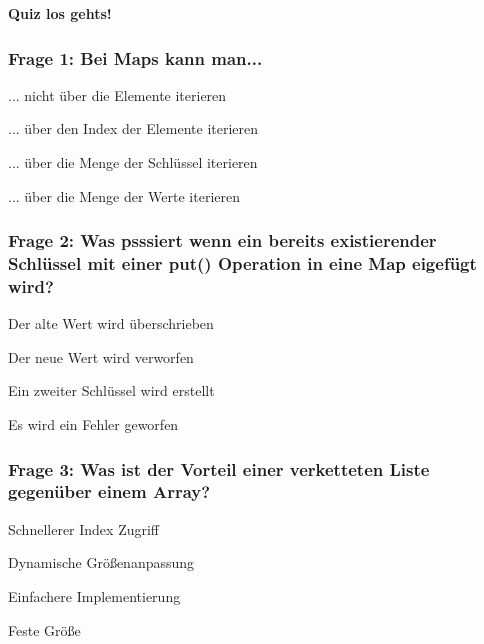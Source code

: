 \documentclass{../../presentation}
\begin{document}
\begin{frame}[plain]
	\centering
	{\Huge\bfseries{Quiz los gehts!}}
\end{frame}

\begin{frame}[fragile]
	\frametitle{Frage 1: Bei Maps kann man...}
	\begin{ausgabe}
		... nicht über die Elemente iterieren
	\end{ausgabe}
	\begin{ausgabe}
		... über den Index der Elemente iterieren
	\end{ausgabe}
	\begin{ausgabe}
		\textcolor<2->{green!100!black}{... über die Menge der Schlüssel iterieren}
	\end{ausgabe}
	\begin{ausgabe}
		... über die Menge der Werte iterieren
	\end{ausgabe}

\end{frame}

\begin{frame}[fragile]
	\frametitle{Frage 2: Was psssiert wenn ein bereits existierender Schlüssel mit einer put() Operation in eine Map eigefügt wird?}
	\begin{ausgabe}
		\textcolor<2->{green!100!black}{Der alte Wert wird überschrieben}
	\end{ausgabe}
	\begin{ausgabe}
		Der neue Wert wird verworfen
	\end{ausgabe}
	\begin{ausgabe}
		Ein zweiter Schlüssel wird erstellt
	\end{ausgabe}
	\begin{ausgabe}
		Es wird ein Fehler geworfen
	\end{ausgabe}
\end{frame}

\begin{frame}[fragile]
	\frametitle{Frage 3: Was ist der Vorteil einer verketteten Liste gegenüber einem Array?}
	\begin{ausgabe}
		Schnellerer Index Zugriff
	\end{ausgabe}
	\begin{ausgabe}
		\textcolor<2->{green!100!black}{Dynamische Größenanpassung}
	\end{ausgabe}
	\begin{ausgabe}
		Einfachere Implementierung
	\end{ausgabe}
	\begin{ausgabe}
		Feste Größe
	\end{ausgabe}
\end{frame}
\end{document}
